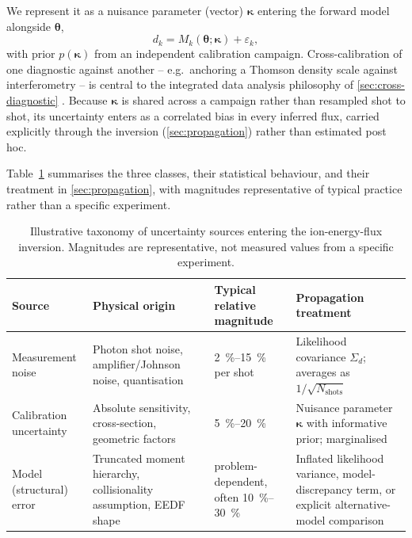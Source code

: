 We represent it as a nuisance parameter (vector) $\boldsymbol{\kappa}$ entering the forward model alongside $\boldsymbol{\theta}$,
\begin{equation}
d_{k} = M_{k}(\boldsymbol{\theta}; \boldsymbol{\kappa}) + \varepsilon_{k},
\label{eq:calib-nuisance}
\end{equation}
with prior $p(\boldsymbol{\kappa})$ from an independent calibration campaign. Cross-calibration of one diagnostic against another -- e.g.\ anchoring a Thomson density scale against interferometry -- is central to the integrated data analysis philosophy of \cref{sec:cross-diagnostic} \cite{ref0707,ref0712}. Because $\boldsymbol{\kappa}$ is shared across a campaign rather than resampled shot to shot, its uncertainty enters as a correlated bias in every inferred flux, carried explicitly through the inversion (\cref{sec:propagation}) rather than estimated post hoc.

Table~\ref{tab:uncertainty-sources} summarises the three classes, their statistical behaviour, and their treatment in \cref{sec:propagation}, with magnitudes representative of typical practice rather than a specific experiment.

\begin{table}[htbp]
\centering
\caption{Illustrative taxonomy of uncertainty sources entering the ion-energy-flux inversion. Magnitudes are representative, not measured values from a specific experiment.}
\label{tab:uncertainty-sources}
\begin{tabular}{@{}p{2.6cm}p{4.6cm}p{2.4cm}p{3.6cm}@{}}
\toprule
Source & Physical origin & Typical relative magnitude & Propagation treatment \\
\midrule
Measurement noise & Photon shot noise, amplifier/Johnson noise, quantisation & \SI{2}{\percent}--\SI{15}{\percent} per shot & Likelihood covariance $\Sigma_{d}$; averages as $1/\sqrt{N_{\text{shots}}}$ \\
Calibration uncertainty & Absolute sensitivity, cross-section, geometric factors & \SI{5}{\percent}--\SI{20}{\percent} & Nuisance parameter $\boldsymbol{\kappa}$ with informative prior; marginalised \\
Model (structural) error & Truncated moment hierarchy, collisionality assumption, EEDF shape & problem-dependent, often \SI{10}{\percent}--\SI{30}{\percent} & Inflated likelihood variance, model-discrepancy term, or explicit alternative-model comparison \\
\bottomrule
\end{tabular}
\end{table}

